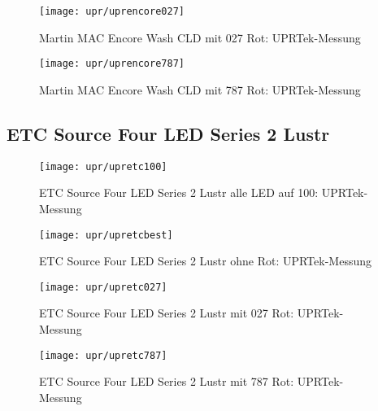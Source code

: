 \documentclass[pagesize,paper=A4,fontsize=12pt,utf8,numbers=noenddot,bibliography=totoc,listof=totoc,DIV=11,BCOR=1mm]{scrreprt}
\begin{document}
\begin{figure}[htp]     %
\centering
\texttt{[image: upr/uprencore027]} 
\caption {Martin MAC Encore Wash CLD mit 027 Rot: UPRTek-Messung} 
\end{figure}

\begin{figure}[htp]     %
\centering
\texttt{[image: upr/uprencore787]} 
\caption {Martin MAC Encore Wash CLD mit 787 Rot: UPRTek-Messung} 
\end{figure}


\subsection{ETC Source Four LED Series 2 Lustr}

\begin{figure}[htp]     %
\centering
\texttt{[image: upr/upretc100]} 
\caption {ETC Source Four LED Series 2 Lustr alle LED auf 100: UPRTek-Messung} 
\end{figure}

\begin{figure}[htp]     %
\centering
\texttt{[image: upr/upretcbest]} 
\caption {ETC Source Four LED Series 2 Lustr ohne Rot: UPRTek-Messung} 
\end{figure}

\begin{figure}[htp]     %
\centering
\texttt{[image: upr/upretc027]} 
\caption {ETC Source Four LED Series 2 Lustr mit 027 Rot: UPRTek-Messung} 
\end{figure}

\begin{figure}[htp]     %
\centering
\texttt{[image: upr/upretc787]} 
\caption {ETC Source Four LED Series 2 Lustr mit 787 Rot: UPRTek-Messung} 
\end{figure}
\end{document}
